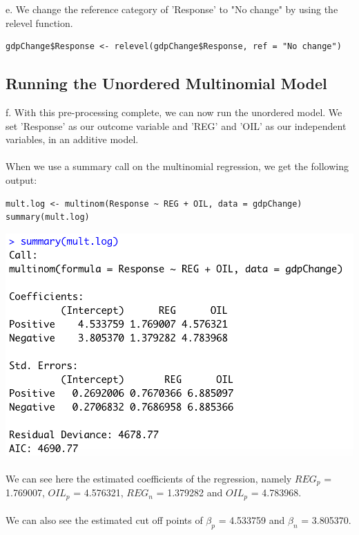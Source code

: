 \documentclass[12pt,letterpaper]{article}
\begin{document}
\noindent e. We change the reference category of 'Response' to "No change" by using the relevel function.
\\
\begin{lstlisting}
gdpChange$Response <- relevel(gdpChange$Response, ref = "No change")
\end{lstlisting}

\subsection{Running the Unordered Multinomial Model}

\noindent f. With this pre-processing complete, we can now run the unordered model. We set 'Response' as our outcome variable and 'REG' and 'OIL' as our independent variables, in an additive model.
\\\\
\noindent When we use a summary call on the multinomial regression, we get the following output:

\begin{lstlisting}
mult.log <- multinom(Response ~ REG + OIL, data = gdpChange)
summary(mult.log)
\end{lstlisting}

\includegraphics[width=\linewidth]{mult.log.reg}
\\\\

\noindent We can see here the estimated coefficients of the regression, namely \texttt{$REG_p$} = 1.769007, \texttt{$OIL_p$} = 4.576321, \texttt{$REG_n$} = 1.379282  and \texttt{$OIL_p$} = 4.783968.
\\\\
\noindent We can also see the estimated cut off points of $\beta_p$ = 4.533759 and $\beta_n$ = 3.805370.
\end{document}
